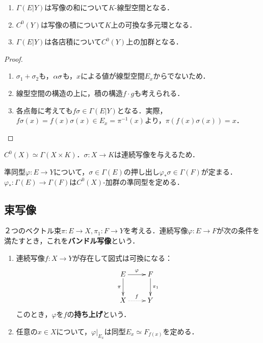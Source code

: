 \documentclass[uplatex,dvipdfmx]{jsreport}
\begin{document}
\begin{lemma}\mbox{}
    \begin{enumerate}
        \item $\Gamma(E|Y)$は写像の和について$K$-線型空間となる．
        \item $C^0(Y)$は写像の積について$K$上の可換な多元環となる．
        \item $\Gamma(E|Y)$は各店積について$C^0(Y)$上の加群となる．
    \end{enumerate}
\end{lemma}
\begin{proof}\mbox{}
    \begin{enumerate}
        \item $\sigma_1+\sigma_2$も，$\alpha\sigma$も，$x$による値が線型空間$E_x$からでないため．
        \item 線型空間の構造の上に，積の構造$f\cdot g$も考えられる．
        \item 各点毎に考えても$f\sigma\in\Gamma(E|Y)$となる．実際，$f\sigma(x)=f(x)\sigma(x)\in E_x=\pi^{-1}(x)$より，$\pi(f(x)\sigma(x))=x$．
    \end{enumerate}
\end{proof}
\begin{remark}
    $C^0(X)\simeq\Gamma(X\times K)$．$\sigma:X\to K$は連続写像を与えるため．
\end{remark}

\begin{definition}[切断の押し出し]
    準同型$\varphi:E\to Y$について，$\sigma\in\Gamma(E)$の押し出し$\varphi_*\sigma\in\Gamma(F)$が定まる．
    $\varphi_*:\Gamma(E)\to\Gamma(F)$は$C^0(X)$-加群の準同型を定める．
\end{definition}

\subsection{束写像}

\begin{definition}
    ２つのベクトル束$\pi:E\to X,\pi_1:F\to Y$を考える．連続写像$\varphi:E\to F$が次の条件を満たすとき，これを\textbf{バンドル写像}という．
    \begin{enumerate}
        \item 連続写像$f:X\to Y$が存在して図式は可換になる：
        \[\xymatrix{
            E\ar[r]^-\varphi\ar[d]_-\pi&F\ar[d]^-{\pi_1}\\
            X\ar@{.>}[r]^f&Y
        }\]
        このとき，$\varphi$を$f$の\textbf{持ち上げ}という．
        \item 任意の$x\in X$について，$\varphi|_{E_x}$は同型$E_x\simeq F_{f(x)}$を定める．
    \end{enumerate}
\end{definition}
\end{document}
